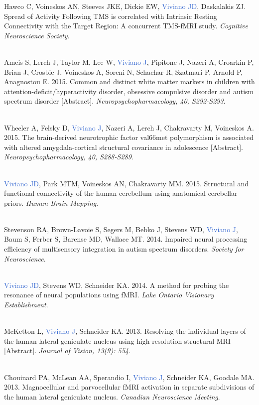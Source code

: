 \documentclass[a4paper,11pt,oneside]{book}
\begin{document}
\begin{flushleft}
Hawco C, Voineskos AN, Steeves JKE, Dickie EW, \textcolor{highlight}{Viviano JD}, Daskalakis ZJ. Spread of Activity Following TMS is correlated with Intrinsic Resting Connectivity with the Target Region: A concurrent TMS-fMRI study. \textit{Cognitive Neuroscience Society}. \\\

Ameis S, Lerch J, Taylor M, Lee W, \textcolor{highlight}{Viviano J}, Pipitone J, Nazeri A, Croarkin P, Brian J, Crosbie J, Voineskos A, Soreni N, Schachar R, Szatmari P, Arnold P, Anagnostou E. 2015. Common and distinct white matter markers in children with attention-deficit/hyperactivity disorder, obsessive compulsive disorder and autism spectrum disorder [Abstract]. \textit{Neuropsychopharmacology, 40, S292-S293}. \\\

Wheeler A, Felsky D, \textcolor{highlight}{Viviano J}, Nazeri A, Lerch J, Chakravarty M, Voineskos A. 2015. The brain-derived neurotrophic factor val66met polymorphism is associated with altered amygdala-cortical structural covariance in adolescence [Abstract]. \textit{Neuropsychopharmacology, 40, S288-S289}. \\\

\textcolor{highlight}{Viviano JD}, Park MTM, Voineskos AN, Chakravarty MM. 2015. Structural and functional connectivity of the human cerebellum using anatomical cerebellar priors. \textit{Human Brain Mapping}. \\\

Stevenson RA, Brown-Lavoie S, Segers M, Bebko J, Stevens WD, \textcolor{highlight}{Viviano J}, Baum S, Ferber S, Barense MD, Wallace MT. 2014. Impaired neural processing efficiency of multisensory integration in autism spectrum disorders. \textit{Society for Neuroscience}. \\\

\textcolor{highlight}{Viviano JD}, Stevens WD, Schneider KA. 2014. A method for probing the resonance of neural populations using fMRI. \textit{Lake Ontario Visionary Establishment}. \\\

McKetton L, \textcolor{highlight}{Viviano J}, Schneider KA. 2013. Resolving the individual layers of the human lateral geniculate nucleus using high-resolution structural MRI [Abstract]. \textit{Journal of Vision, 13(9): 554}. \\\

Chouinard PA, McLean AA, Sperandio I, \textcolor{highlight}{Viviano J}, Schneider KA, Goodale MA. 2013. Magnocellular and parvocellular fMRI activation in separate subdivisions of the human lateral geniculate nucleus. \textit{Canadian Neuroscience Meeting}. \\\


\end{flushleft}
\end{document}
